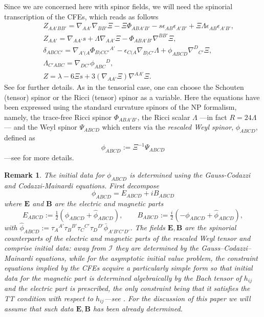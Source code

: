 \documentclass[10pt,a4paper]{article}
\theoremstyle{plain}
\newtheorem{remark}{Remark}
\def\bmB{{\bm B}}
\def\bmE{{\bm E}}
\begin{document}
\noindent Since we are concerned here with spinor fields, we will need the
spinorial transcription of the CFEs, which reads as follows
\begin{subequations}
\begin{eqnarray}
   &&  Z_{AA'BB'}  =  \nabla_{AA'}\nabla_{BB'}\Xi - \Xi \Phi _{ABA'B'}  - s \epsilon _{AB} \epsilon
  _{A'B'} + \Xi \Lambda \epsilon _{AB} \epsilon _{A'B'} ,
  \label{Def_ConfFactor_CFE_zeroquant}\\
  && Z_{AA'}  = \nabla_{AA'}s + \Lambda  \nabla_{AA'}\Xi   - \Phi _{ABA'B'} \nabla^{BB'}\Xi ,\label{Def_s_CFE_zeroquant}\\
 &&  \delta_{ABCC'} =   \nabla_{A'(A}\Phi _{B)CC'}{}^{A'} - \epsilon _{C(A} \nabla_{B)C'}\Lambda   +  \phi _{ABCD} \nabla^{D}{}_{C'}\Xi ,\label{Def_delta_CFE_zeroquant} \\
  && \Lambda _{C'ABC}  = \nabla_{DC'}\phi _{ABC}{}^{D}, \label{Def_Lambda_CFE_zeroquant}\\
   && Z  = \lambda   -6 \Xi  s + 3 (\nabla_{AA'}\Xi)  \nabla^{AA'}\Xi. \label{Def_cons_CFE_zeroquant}
\end{eqnarray}
\end{subequations}
See \cite{CFEbook} for further details.
As in the tensorial case, one can choose the
Schouten (tensor) spinor or the Ricci (tensor) spinor as a variable.
Here the equations have been expressed
using the standard curvature spinors of the NP formalism,
namely, the trace-free Ricci spinor $\Phi_{ABA'B'}$, the Ricci scalar
$\Lambda$ ---in fact $R= 24\Lambda$--- and the Weyl spinor
$\Psi_{ABCD}$ which enters via the \emph{rescaled Weyl spinor}, $\phi_{ABCD}$,
defined as 
\begin{equation}\label{Def_rescaled_Weyl_spinor}
\phi_{ABCD} := \Xi^{-1} \Psi_{ABCD}
\end{equation}
 ---see \cite{Ste91, PenRin84} for more details. 
 \begin{remark}
 \label{G-C-M-Remark}
   \emph{The initial data for $\phi_{ABCD}$ is determined using the Gauss-Codazzi and Codazzi-Mainardi equations. First decompose 
   \[ \phi_{ABCD}=E_{ABCD}+iB_{ABCD}\]
where $\bmE$ and $\bmB$ are the \textit{electric} and \textit{magnetic} parts
   \[
   E_{ABCD} := \tfrac{1}{2}(\phi_{ABCD} + \hat{\phi}_{ABCD}),\qquad B_{ABCD} := \tfrac{i}{2}(-\phi_{ABCD} + \hat{\phi}_{ABCD}),
  \]
  with $\hat{\phi}_{ABCD}:=\tau_A{}^{A'}\tau_B{}^{B'}\tau_C{}^{C'}\tau_D{}^{D'}\bar{\phi}_{A'B'C'D'}$. The fields $\bmE,\bmB$ are the spinorial counterparts of the electric and magnetic parts of the rescaled Weyl tensor and comprise initial data: away from $\mathscr{I}$ they are determined by the Gauss--Codazzi--Mainardi equations, while
   for the asymptotic initial value problem, the constraint equations
   implied by the CFEs acquire a particularly simple form so that
   initial data for the magnetic part is
   determined algebraically by 
   the Bach tensor of $h_{ij}$ and the
   electric part is prescribed, the only constraint being that it satisfies the \textit{TT} condition with respect to $h_{ij}$---see
   \cite{CFEbook, GasVal17a}.
   For the discussion of this paper we will
   assume that such data $\bmE, \bmB$ has been already determined.}
\end{remark}
\end{document}
